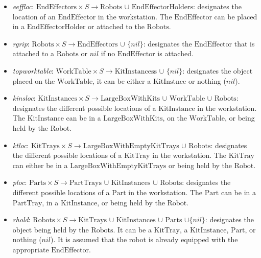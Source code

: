 \documentclass[a4paper, 10pt, conference]{ieeeconf}      %
\begin{document}
\begin{itemize}
\item \emph{eeffloc}: $\mathrm{EndEffectors}\times S\rightarrow\mathrm{Robots}$ $\cup$ $\mathrm{EndEffectorHolders}$: designates the location of an $\mathrm{EndEffector}$ in the workstation. The $\mathrm{EndEffector}$ can be placed in a $\mathrm{EndEffectorHolder}$ or attached to the $\mathrm{Robots}$.

\item \emph{rgrip}: $\mathrm{Robots}\times S\rightarrow\mathrm{EndEffectors}$ $\cup$ $\lbrace nil\rbrace$: designates the $\mathrm{EndEffector}$ that is attached to a $\mathrm{Robots}$ or $nil$ if no $\mathrm{EndEffector}$ is attached.

\item \emph{topworktable}: $\mathrm{WorkTable}\times S\rightarrow\mathrm{KitInstancess}$ $\cup$ $\lbrace nil\rbrace$: designates the object placed on the $\mathrm{WorkTable}$, it can be either a $\mathrm{KitInstnce}$ or nothing ($nil$).

\item \emph{kinsloc}: $\mathrm{KitInstances}\times S\rightarrow\mathrm{LargeBoxWithKits}$ $\cup$ $\mathrm{WorkTable}$ $\cup$ $\mathrm{Robots}$: designates the different possible locations of a $\mathrm{KitInstance}$ in the workstation. The $\mathrm{KitInstance}$ can be in a $\mathrm{LargeBoxWithKits}$, on the $\mathrm{WorkTable}$, or being held by the $\mathrm{Robot}$.

\item \emph{ktloc}: $\mathrm{KitTrays}\times S\rightarrow\mathrm{LargeBoxWithEmptyKitTrays}$ $\cup$ $\mathrm{Robots}$: designates the different possible locations of a $\mathrm{KitTray}$ in the workstation. The $\mathrm{KitTray}$ can either be in a $\mathrm{LargeBoxWithEmptyKitTrays}$ or being held by the $\mathrm{Robot}$.

\item \emph{ploc}: $\mathrm{Parts}\times S\rightarrow\mathrm{PartTrays}$ $\cup$ $\mathrm{KitInstances}$ $\cup$ $\mathrm{Robots}$: designates the different possible locations of a $\mathrm{Part}$ in the workstation. The $\mathrm{Part}$ can be in a $\mathrm{PartTray}$, in a $\mathrm{KitInstance}$, or being held by the $\mathrm{Robot}$.

\item \emph{rhold}: $\mathrm{Robots}\times S\rightarrow\mathrm{KitTrays}$ $\cup$ $\mathrm{KitInstances}$ $\cup$ $\mathrm{Parts}$ $\cup \lbrace nil\rbrace$: designates the object being held by the $\mathrm{Robots}$. It can be a $\mathrm{KitTray}$, a $\mathrm{KitInstance}$, $\mathrm{Part}$, or nothing ($nil$). It is assumed that the robot is already equipped with the appropriate $\mathrm{EndEffector}$.


\end{itemize}
\end{document}
